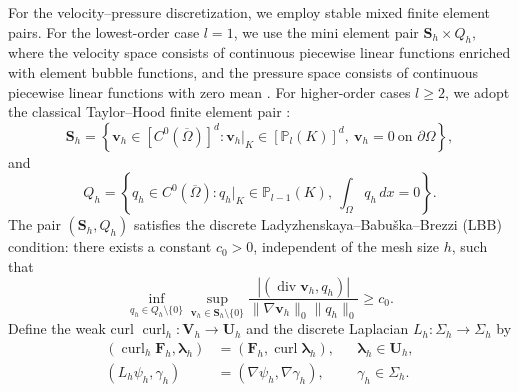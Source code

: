 \documentclass[11pt,a4paper]{article}
\newcommand{\bs}{\boldsymbol}
\DeclareMathOperator{\curl}{curl}
\DeclareMathOperator{\ddiv}{div}
\newcommand{\Div}{\ddiv}
\theoremstyle{definition}
\numberwithin{equation}{section}
\begin{document}
For the velocity--pressure discretization, we employ stable mixed
finite element pairs. For the lowest-order case \(l=1\), we use the
mini element pair
\(
\bs S_h\times Q_h,
\)
where the velocity space consists of continuous piecewise linear
functions enriched with element bubble functions, and the pressure
space consists of continuous piecewise linear functions with zero
mean \cite{Arnoldmini1984}. 
For higher-order cases \(l\ge2\), we adopt the classical Taylor--Hood
finite element pair \cite{TaylorHood1973}:
\[
\bs S_h
=
\left\{
\boldsymbol v_h\in [C^0(\overline\Omega)]^d:
\boldsymbol v_h|_K\in [\mathbb P_l(K)]^d,
\ \boldsymbol v_h=0\ \text{on }\partial\Omega
\right\},
\]
and
\[
Q_h
=
\left\{
q_h\in C^0(\overline\Omega):
q_h|_K\in\mathbb P_{l-1}(K),
\ \int_\Omega q_h\,dx=0
\right\}.
\]
The pair
\((\bs S_h,Q_h)\) satisfies the discrete
Ladyzhenskaya--Babuška--Brezzi (LBB) condition: there exists a constant
\(c_0>0\), independent of the mesh size \(h\), such that
\begin{equation}\label{eq:discrete-infsup}
 \inf_{q_h\in Q_h\setminus\{0\}}
 \sup_{\bs v_h\in\bs S_h\setminus\{0\}}
 \frac{|(\Div\bs v_h,q_h)|}
 {\|\nabla\bs v_h\|_{0}\|q_h\|_{0}}
 \ge c_0 .
\end{equation}
%
%
%
Define the weak curl $\curl_h:\bs V_h \to \bs U_h$ and the discrete Laplacian $L_h: \Sigma_h \to \Sigma_h$ by
\begin{equation}\label{eq:weak-operators}
\begin{aligned}
 (\curl_h\bs F_h,\bs\lambda_h)&=(\bs F_h,\curl\bs\lambda_h),
 &&\bs\lambda_h\in\bs U_h,\\
 (L_h\psi_h,\gamma_h)&=(\nabla\psi_h,\nabla\gamma_h),
 &&\gamma_h\in\Sigma_h.
\end{aligned}
\end{equation}
\end{document}
